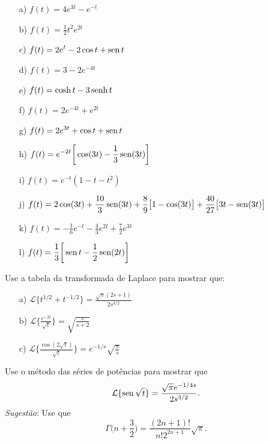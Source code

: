 \begin{Answer}
\begin{itemize}
  \item[a)] $\displaystyle f(t) = 4e^{3t} - e^{-t}$
  \item[b)] $\displaystyle f(t) = \frac{1}{2} t^2 e^{2t}$
  \item[c)] $\displaystyle f(t) = 2e^{t} - 2 \cos t + \operatorname{sen} t$
  \item[d)] $\displaystyle f(t) = 3 -2 e^{-4t}$
  \item[e)] $\displaystyle f(t) = \cosh t - 3 \operatorname{senh} t$
  \item[f)] $\displaystyle f(t) = 2e^{-4t} + e^{2t}$
  \item[g)] $\displaystyle f(t) = 2e^{3t} + \cos t + \operatorname{sen} t$
  \item[h)] $\displaystyle f(t) = e^{-2t}\bigg[ \cos(3t) - \frac{1}{3} \operatorname{sen} (3t) \bigg]$
  \item[i)] $\displaystyle f(t) = e^{-t}(1-t-t^2)$
  \item[j)] $\displaystyle f(t) = 2\cos(3t) +\frac{10}{3} \operatorname{sen}(3t) +\frac{8}{9} \big[1-\cos(3t)\big] + \frac{40}{27} \big[3t - \operatorname{sen}(3t)\big]$
  \item[k)] $\displaystyle f(t) = -\frac{1}{6} e^{-t} -\frac{4}{3} e^{2t} + \frac{7}{2} e^{3t}$
  \item[l)] $\displaystyle f(t) = \frac{1}{3} \bigg[ \operatorname{sen} t - \frac{1}{2}\operatorname{sen}(2t) \bigg]$
\end{itemize}
\end{Answer}


\begin{Exercise}
Use a tabela da transformada de Laplace para mostrar que:

\begin{itemize}
  \item[a)] $\displaystyle \mathcal{L} \big\{ t^{1/2}+ t^{-1/2} \big\} = \frac{\sqrt{\pi}(2s+1)}{2s^{3/2}}$
  \item[b)] $\displaystyle \mathcal{L} \bigg\{ \frac{e^{-2t}}{\sqrt{t}} \bigg\} = \sqrt{\frac{\pi}{s+2}}$
  \item[c)] $\displaystyle \mathcal{L} \bigg\{ \frac{\cos(2\sqrt{t}) }{\sqrt{t}} \bigg\} = e^{-1/s}\sqrt{\frac{\pi}{s}}$
\end{itemize}
\end{Exercise}


\begin{Exercise}
Use o método das séries de potências para mostrar que \[\mathcal{L} \{\operatorname{sen} \sqrt{t} \} =  \frac{\sqrt{\pi} e^{-1/4s}}{2s^{3/2}}.\]
\emph{Sugestão}: Use que \[\Gamma\bigg( n + \frac{3}{2} \bigg) = \frac{ (2n+1)!}{ n! 2^{2n+1}}\sqrt{\pi}.\]
\end{Exercise}

